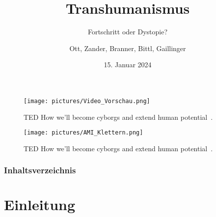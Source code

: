 \documentclass[aspectratio=169,16pt,xcolor=table]{beamer}
\date{15. Januar 2024}
\begin{document}
\begin{frame}
  \begin{figure}[h!]
    \centering   
	\texttt{[image: pictures/Video\_Vorschau.png]}
    \caption{
      TED How we'll become cyborgs and extend human potential~\cite{youtube_ted}.
    }
    \label{fig:basics AFM sketch}
  \end{figure}
\end{frame}

\begin{frame}
  \begin{figure}[h!]
    \centering   
	\texttt{[image: pictures/AMI\_Klettern.png]}
  \caption{
    TED How we'll become cyborgs and extend human potential~\cite{youtube_ted}.
  }
  \label{fig:basics AFM sketch}
  \end{figure}
\end{frame}

\title{Transhumanismus}
\subtitle{Fortschritt oder Dystopie?}
\author{Ott, Zander, Branner, Bittl, Gaillinger}

\maketitle

\begin{frame}[allowframebreaks]
	\frametitle{Inhaltsverzeichnis}
	\tableofcontents
\end{frame}

\section{Einleitung}
\end{document}
